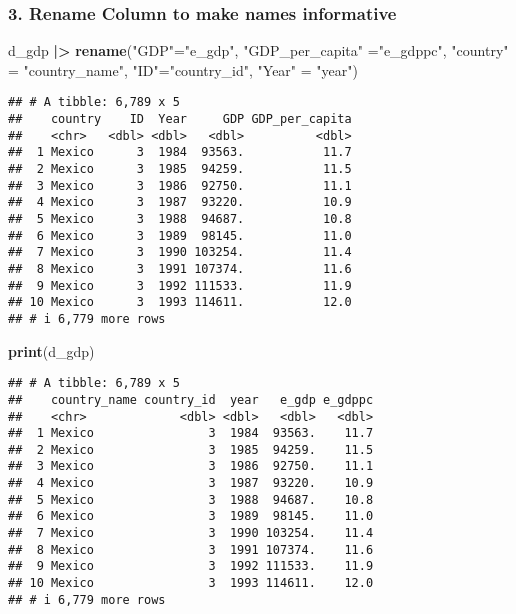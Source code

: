 \documentclass[
]{article}
\newenvironment{Shaded}{\begin{snugshade}}{\end{snugshade}}
\newcommand{\FunctionTok}[1]{\textcolor[rgb]{0.13,0.29,0.53}{\textbf{#1}}}
\newcommand{\NormalTok}[1]{#1}
\newcommand{\OtherTok}[1]{\textcolor[rgb]{0.56,0.35,0.01}{#1}}
\newcommand{\SpecialCharTok}[1]{\textcolor[rgb]{0.81,0.36,0.00}{\textbf{#1}}}
\newcommand{\StringTok}[1]{\textcolor[rgb]{0.31,0.60,0.02}{#1}}
\begin{document}
\hypertarget{rename-column-to-make-names-informative}{%
\subsubsection{3. Rename Column to make names
informative}\label{rename-column-to-make-names-informative}}

\begin{Shaded}
\begin{Highlighting}[]
\NormalTok{d\_gdp }\SpecialCharTok{|\textgreater{}}
  \FunctionTok{rename}\NormalTok{(}\StringTok{"GDP"}\OtherTok{=}\StringTok{"e\_gdp"}\NormalTok{, }\StringTok{"GDP\_per\_capita"} \OtherTok{=}\StringTok{"e\_gdppc"}\NormalTok{, }\StringTok{"country"} \OtherTok{=} \StringTok{"country\_name"}\NormalTok{, }\StringTok{"ID"}\OtherTok{=}\StringTok{"country\_id"}\NormalTok{, }\StringTok{"Year"} \OtherTok{=} \StringTok{"year"}\NormalTok{)}
\end{Highlighting}
\end{Shaded}

\begin{verbatim}
## # A tibble: 6,789 x 5
##    country    ID  Year     GDP GDP_per_capita
##    <chr>   <dbl> <dbl>   <dbl>          <dbl>
##  1 Mexico      3  1984  93563.           11.7
##  2 Mexico      3  1985  94259.           11.5
##  3 Mexico      3  1986  92750.           11.1
##  4 Mexico      3  1987  93220.           10.9
##  5 Mexico      3  1988  94687.           10.8
##  6 Mexico      3  1989  98145.           11.0
##  7 Mexico      3  1990 103254.           11.4
##  8 Mexico      3  1991 107374.           11.6
##  9 Mexico      3  1992 111533.           11.9
## 10 Mexico      3  1993 114611.           12.0
## # i 6,779 more rows
\end{verbatim}

\begin{Shaded}
\begin{Highlighting}[]
\FunctionTok{print}\NormalTok{(d\_gdp)}
\end{Highlighting}
\end{Shaded}

\begin{verbatim}
## # A tibble: 6,789 x 5
##    country_name country_id  year   e_gdp e_gdppc
##    <chr>             <dbl> <dbl>   <dbl>   <dbl>
##  1 Mexico                3  1984  93563.    11.7
##  2 Mexico                3  1985  94259.    11.5
##  3 Mexico                3  1986  92750.    11.1
##  4 Mexico                3  1987  93220.    10.9
##  5 Mexico                3  1988  94687.    10.8
##  6 Mexico                3  1989  98145.    11.0
##  7 Mexico                3  1990 103254.    11.4
##  8 Mexico                3  1991 107374.    11.6
##  9 Mexico                3  1992 111533.    11.9
## 10 Mexico                3  1993 114611.    12.0
## # i 6,779 more rows
\end{verbatim}
\end{document}
